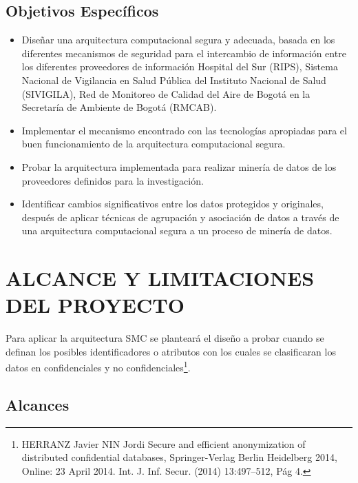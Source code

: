 \documentclass[a4paper,openright,12pt]{book}
\theoremstyle{definition}
\theoremstyle{remark}
\begin{document}
\subsection{Objetivos Específicos}
\begin{itemize}
\item Diseñar una arquitectura computacional segura y adecuada, basada en los diferentes mecanismos de seguridad para el intercambio de información entre los diferentes proveedores de información Hospital del Sur (RIPS), Sistema Nacional de Vigilancia en Salud Pública del Instituto Nacional de Salud (SIVIGILA), Red de Monitoreo de Calidad del Aire de Bogotá en la Secretaría de Ambiente de Bogotá (RMCAB).
\item Implementar el mecanismo encontrado con las tecnologías apropiadas para el buen funcionamiento de la arquitectura computacional segura.
\item Probar la arquitectura implementada para realizar minería de datos de los proveedores definidos para la investigación.
\item Identificar cambios significativos entre los datos protegidos y originales, después de aplicar técnicas de agrupación y asociación de datos a través de una arquitectura computacional segura a un proceso de minería de datos.

\end{itemize}

\section{ALCANCE Y LIMITACIONES DEL PROYECTO}

Para aplicar la arquitectura SMC se planteará el diseño a probar cuando se definan los posibles identificadores o atributos  con los cuales se clasificaran los datos en confidenciales y no confidenciales\footnote{HERRANZ Javier NIN Jordi Secure and efficient anonymization of distributed confidential databases, Springer-Verlag Berlin Heidelberg 2014, Online: 23 April 2014. Int. J. Inf. Secur. (2014) 13:497–512, Pág 4.}.


\subsection{Alcances}
\end{document}
